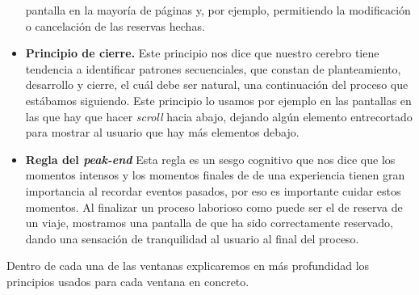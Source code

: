 \begin{itemize}
            pantalla en la mayoría de páginas y, por ejemplo, permitiendo la modificación o cancelación de las reservas hechas.
      \item \textbf{Principio de cierre.} Este principio nos dice que nuestro cerebro tiene tendencia a identificar patrones secuenciales, que constan de planteamiento, desarrollo y cierre,
            el cuál debe ser natural, una continuación del proceso que estábamos siguiendo. Este principio lo usamos por ejemplo en las pantallas en las que hay que hacer \textit{scroll} hacia abajo,
            dejando algún elemento entrecortado para mostrar al usuario que hay más elementos debajo.
      \item \textbf{Regla del \textit{peak-end}} Esta regla es un sesgo cognitivo que nos dice que los momentos intensos y los momentos finales de
            de una experiencia tienen gran importancia al recordar eventos pasados, por eso es importante cuidar estos momentos. Al finalizar un proceso laborioso como
            puede ser el de reserva de un viaje, mostramos una pantalla de que ha sido correctamente reservado, dando una sensación de tranquilidad al usuario
            al final del proceso.

\end{itemize}

Dentro de cada una de las ventanas explicaremos en más profundidad los principios usados para cada ventana en concreto.
